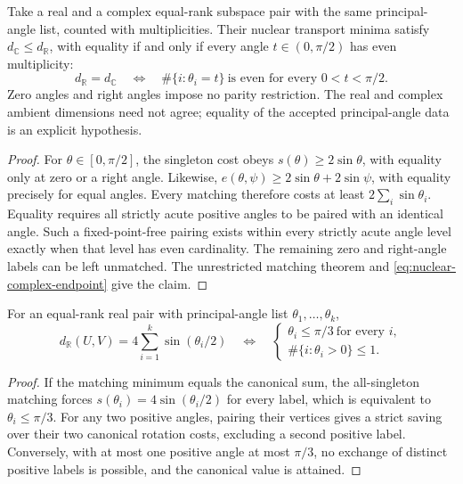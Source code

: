 \begin{theorem}
\label{thm:nuclear-real-complex-parity}
Take a real and a complex equal-rank subspace pair with the same
principal-angle list, counted with multiplicities. Their nuclear
transport minima satisfy $d_{\mathbb C}\le d_{\mathbb R}$, with equality
if and only if every angle $t\in(0,\pi/2)$ has even multiplicity:
\begin{equation}
 d_{\mathbb R}=d_{\mathbb C}
 \quad\Longleftrightarrow\quad
 \#\{i:\theta_i=t\}\ \text{is even for every }0<t<\pi/2.
 \label{eq:nuclear-parity}
\end{equation}
Zero angles and right angles impose no parity restriction.
The real and complex ambient dimensions need not agree; equality of
the accepted principal-angle data is an explicit hypothesis.
\end{theorem}

\begin{proof}
For $\theta\in[0,\pi/2]$, the singleton cost obeys
$s(\theta)\ge2\sin\theta$, with equality only at zero or a right
angle. Likewise,
$e(\theta,\psi)\ge2\sin\theta+2\sin\psi$,
with equality precisely for equal angles. Every matching therefore
costs at least $2\sum_i\sin\theta_i$.
Equality requires all strictly acute positive angles to be paired
with an identical angle. Such a fixed-point-free pairing exists
within every strictly acute angle level exactly when that level has
even cardinality. The remaining zero and right-angle labels can be
left unmatched. The unrestricted matching theorem and
\cref{eq:nuclear-complex-endpoint} give the claim.
\end{proof}

\begin{theorem}
\label{thm:nuclear-real-canonical-value}
For an equal-rank real pair with principal-angle list
$\theta_1,\ldots,\theta_k$,
\begin{equation}
 d_{\mathbb R}(U,V)=4\sum_{i=1}^k\sin(\theta_i/2)
 \quad\Longleftrightarrow\quad
 \left\{\begin{array}{l}
   \theta_i\le\pi/3\ \text{for every }i,\\
   \#\{i:\theta_i>0\}\le1.
 \end{array}\right.
 \label{eq:nuclear-real-canonical-value}
\end{equation}
\end{theorem}

\begin{proof}
If the matching minimum equals the canonical sum, the all-singleton
matching forces $s(\theta_i)=4\sin(\theta_i/2)$ for every label,
which is equivalent to $\theta_i\le\pi/3$. For any two positive
angles, pairing their vertices gives a strict saving over their two
canonical rotation costs, excluding a second positive label.
Conversely, with at most one positive angle at most $\pi/3$,
no exchange of distinct positive labels is possible, and the
canonical value is attained.
\end{proof}

